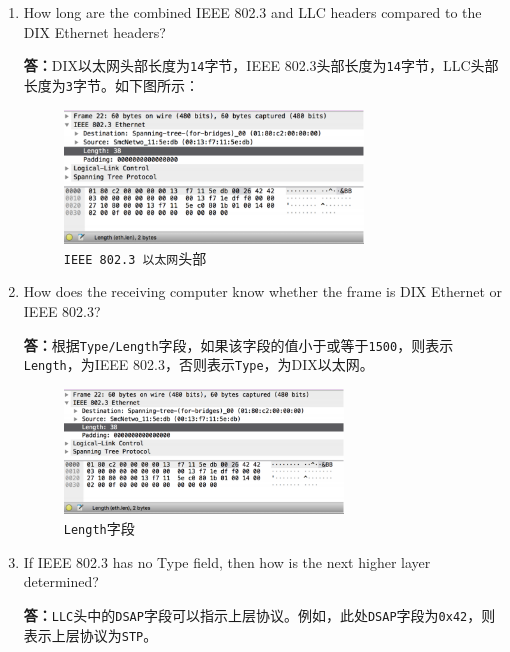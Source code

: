 \documentclass{article}
\begin{document}
\begin{enumerate}[noitemsep]
  \item How long are the combined IEEE 802.3 and LLC headers compared to the
        DIX Ethernet headers?

        \textbf{答：}DIX以太网头部长度为\texttt{14}字节，IEEE 802.3头部长度为\texttt{14}字节，LLC头部长度为\texttt{3}字节。如下图所示：

        \begin{figure}[H]
          \centering
          \includegraphics[width=0.75\textwidth]{images/18.png}
          \caption{\texttt{IEEE 802.3 以太网}头部}
        \end{figure}

  \item How does the receiving computer know whether the frame is DIX Ethernet
        or IEEE 802.3?

        \textbf{答：}根据\texttt{Type/Length}字段，如果该字段的值小于或等于\texttt{1500}，则表示\texttt{Length}，为IEEE 802.3，否则表示\texttt{Type}，为DIX以太网。

        \begin{figure}[H]
          \centering
          \includegraphics[width=0.7\textwidth]{images/18.png}
          \caption{\texttt{Length}字段}
        \end{figure}

  \item If IEEE 802.3 has no Type field, then how is the next higher layer
        determined?

        \textbf{答：}\texttt{LLC}头中的\texttt{DSAP}字段可以指示上层协议。例如，此处\texttt{DSAP}字段为\texttt{0x42}，则表示上层协议为\texttt{STP}。


\end{enumerate}
\end{document}
